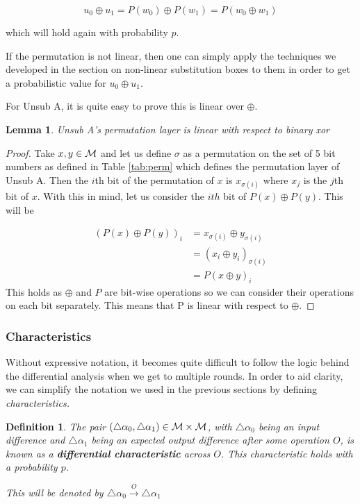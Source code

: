 \documentclass[12pt,a4paper]{article}
\newtheorem{definition}[theorem]{Definition}
\newtheorem{lemma}[theorem]{Lemma}
\newcommand{\differ}[1] {\overset{#1}{\rightarrow}}
\begin{document}
\[u_0 \oplus u_1 = P(w_0) \oplus P(w_1) = P(w_0 \oplus w_1)\]

which will hold again with probability $p$.

If the permutation is not linear, then one can simply apply the techniques we
developed in the section on non-linear substitution boxes to them in order to
get a probabilistic value for $u_0 \oplus u_1$.

For Unsub A, it is quite easy to prove this is linear over $\oplus$. 

\begin{lemma}
Unsub A's permutation layer is linear with respect to binary xor
\end{lemma}
\begin{proof}
Take $x,y \in \cal{M}$ and let us define $\sigma$ as a permutation on the set of 5 bit numbers as defined in
Table \ref{tab:perm} which defines the permutation layer of Unsub A. Then the
$i$th bit of the permutation of $x$ is $x_{\sigma(i)}$ where $x_j$ is the $j$th
bit of $x$. With this in mind, let us
consider the $ith$ bit of $P(x) \oplus P(y)$. This will be 

\begin{align*}
\left(P(x) \oplus P(y)\right)_i &= x_{\sigma(i)} \oplus y_{\sigma(i)} \\
                     &= (x_i \oplus y_i)_{\sigma(i)} \\
                     &= P(x \oplus y)_i
\end{align*}
This holds as $\oplus$ and $P$ are bit-wise operations so we can consider their
operations on each bit separately. This means that P is linear with
respect to $\oplus$.
\end{proof}

\subsubsection{Characteristics}

Without expressive notation, it becomes quite difficult to follow the logic
behind the differential analysis when we get to multiple rounds. In order to
aid clarity, we can simplify the notation we used in the previous sections by
defining \textit{characteristics.} 

\begin{definition}
The pair $(\triangle \alpha_0,\triangle \alpha_1) \in \cal{M} \times \cal{M}$, with
$\triangle \alpha_0$ being an input difference and
$\triangle \alpha_1$ being an expected output difference after some operation $O$, is known as a
\textbf{differential characteristic} across $O$. This characteristic holds with a probability
$p$. 

This will be denoted by $\triangle \alpha_0 \differ{O} \triangle \alpha_1$
\end{definition}
\end{document}
